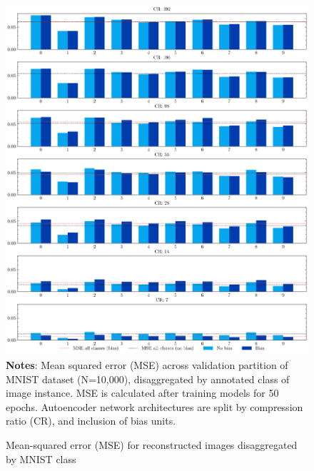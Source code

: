 \begin{figure}
    \caption{Mean-squared error (MSE) for reconstructed images disaggregated by MNIST class}
	\label{fig:decoded-instances}
	\includegraphics[width=1.0\textwidth]{graphics/mse_by_class.pdf}
    \textbf{Notes}: Mean squared error (MSE) across validation partition of MNIST dataset (N=10,000), disaggregated by annotated class of image instance. MSE is calculated after training models for 50 epochs. Autoencoder network architectures are split by compression ratio (CR), and inclusion of bias units.
\end{figure}


